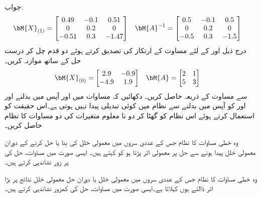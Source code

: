 جواب:
\begin{align*}
\bM{X}_{(1)}&=
\begin{bmatrix} 0.49&-0.1&0.51\\0&0.2&0\\-0.51&0.3&-1.47 \end{bmatrix} &
\bM{A}^{-1}&=\begin{bmatrix} 0.5&-0.1&0.5\\ 0&0.2&0\\ -0.5&0.3&-1.5 \end{bmatrix}
\end{align*}
\quad
درج ذیل  اور   کے لئے مساوت  کے ارتکاز کی تصدیق کرتے ہوئے  دو قدم چل کر درست حل کے ساتھ موازنہ کریں۔
\begin{align*}
\bM{X}_{(0)}&=\begin{bmatrix} 2.9& -0.9\\-4.9&1.9 \end{bmatrix} &
\bM{A}&=\begin{bmatrix} 2&1\\ 5&3 \end{bmatrix}
\end{align*}
\quad
{} سے مساوت  کے ذریعہ  حاصل کریں۔
\quad
دکھائیں کہ مساوات  میں  اور  آپس میں بدلنے اور  اور  کو آپس میں بدلنے سے نظام میں کوئی تبدیلی پیدا نہیں ہوتی ہے۔اس حقیقت کو استعمال کرتے ہوئے اس نظام کو گھٹا کر دو نا معلوم متغیرات کی دو مساوات کا نظام حاصل کریں۔

وہ خطی مساوات کا نظام جس کے عددی سروں میں معمولی خلل کی بنا یا حل کرنے کے دوران معمولی خلل پیدا ہونے سے حل پر معمولی اثر پڑتا ہو کو  کہتے ہیں۔ ایسی صورت میں مساوات، حل کی پر زور نشاندہی کرتے ہیں۔

وہ خطی مساوات کا نظام جس کے عددی سروں میں معمولی خلل یا دوران حل معمولی خلل نتائج پر بڑا اثر ڈالتے ہوں  کہلاتا ہے۔ایسی صورت میں مساوات، حل کی کمزور نشاندہی کرتے ہیں۔

